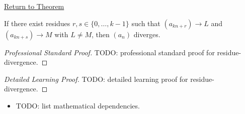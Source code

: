 \newpage
{}
\label{prf:residue-divergence}

\begin{remark*}[Return]
\hyperref[prop:residue-divergence]{Return to Theorem}
\end{remark*}

\begin{proposition*}
If there exist residues $r, s \in \{0,\ldots,k-1\}$ such that
$(a_{kn+r}) \to L$ and $(a_{kn+s}) \to M$ with $L \neq M$, then
$(a_n)$ diverges.
\end{proposition*}

\begin{proof}[Professional Standard Proof]
\LRAProofBodyStart
TODO: professional standard proof for residue-divergence.
\end{proof}

\begin{proof}[Detailed Learning Proof]
\LRAProofBodyStart
TODO: detailed learning proof for residue-divergence.
\end{proof}

\begin{remark*}
\end{remark*}

\begin{dependencies}
\begin{itemize}
  \item TODO: list mathematical dependencies.
\end{itemize}
\end{dependencies}

\clearpage
